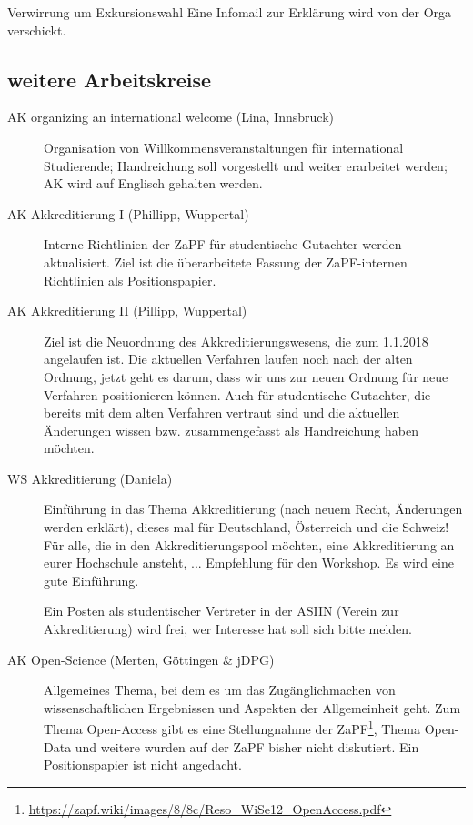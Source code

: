     \begin{info}{Verwirrung um Exkursionswahl}
      Eine Infomail zur Erklärung wird von der Orga verschickt.
    \end{info}

  \subsection{weitere Arbeitskreise}
    \begin{description}
      \item[AK organizing an international welcome (Lina, Innsbruck)]
        Organisation von Willkommensveranstaltungen für international Studierende; Handreichung soll vorgestellt und weiter erarbeitet werden; AK wird auf Englisch gehalten werden.
      \item[AK Akkreditierung I (Phillipp, Wuppertal)]
        Interne Richtlinien der ZaPF für studentische Gutachter werden aktualisiert. Ziel ist die überarbeitete Fassung der ZaPF-internen Richtlinien als Positionspapier.
      \item[AK Akkreditierung II (Pillipp, Wuppertal)]
        Ziel ist die Neuordnung des Akkreditierungswesens, die zum 1.1.2018 angelaufen ist. Die aktuellen Verfahren laufen noch nach der alten Ordnung, jetzt geht es darum, dass wir uns zur neuen Ordnung für neue Verfahren positionieren können.
        Auch für studentische Gutachter, die bereits mit dem alten Verfahren vertraut sind und die aktuellen Änderungen wissen bzw. zusammengefasst als Handreichung haben möchten.
      \item[WS Akkreditierung (Daniela)]
        Einführung in das Thema Akkreditierung (nach neuem Recht, Änderungen werden erklärt), dieses mal für Deutschland, Österreich und die Schweiz!
        Für alle, die in den Akkreditierungspool möchten, eine Akkreditierung an eurer Hochschule ansteht, ... Empfehlung für den Workshop. Es wird eine gute Einführung.
        \begin{info}{}
          Ein Posten als studentischer Vertreter in der ASIIN (Verein zur Akkreditierung) wird frei, wer Interesse hat soll sich bitte melden.
        \end{info}
      \item[AK Open-Science (Merten, Göttingen \& jDPG)]
        Allgemeines Thema, bei dem es um das Zugänglichmachen von wissenschaftlichen Ergebnissen und Aspekten der Allgemeinheit geht. Zum Thema Open-Access gibt es eine Stellungnahme der ZaPF\footnote{\url{https://zapf.wiki/images/8/8c/Reso_WiSe12_OpenAccess.pdf}}, Thema Open-Data und weitere wurden auf der ZaPF bisher nicht diskutiert.
        Ein Positionspapier ist nicht angedacht.
    \end{description}

